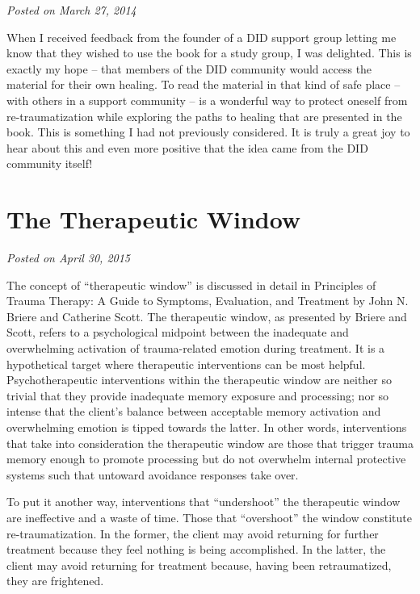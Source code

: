 \documentclass[]{book}
\begin{document}
\emph{Posted on March 27, 2014}

When I received feedback from the founder of a DID support group letting me know that they wished to use the book for a study group, I was delighted. This is exactly my hope -- that members of the DID community would access the material for their own healing. To read the material in that kind of safe place -- with others in a support community -- is a wonderful way to protect oneself from re-traumatization while exploring the paths to healing that are presented in the book. This is something I had not previously considered. It is truly a great joy to hear about this and even more positive that the idea came from the DID community itself!

\hypertarget{the-therapeutic-window}{%
\section{The Therapeutic Window}\label{the-therapeutic-window}}

\emph{Posted on April 30, 2015}

The concept of ``therapeutic window'' is discussed in detail in Principles of Trauma Therapy: A Guide to Symptoms, Evaluation, and Treatment by John N. Briere and Catherine Scott. The therapeutic window, as presented by Briere and Scott, refers to a psychological midpoint between the inadequate and overwhelming activation of trauma-related emotion during treatment. It is a hypothetical target where therapeutic interventions can be most helpful. Psychotherapeutic interventions within the therapeutic window are neither so trivial that they provide inadequate memory exposure and processing; nor so intense that the client's balance between acceptable memory activation and overwhelming emotion is tipped towards the latter. In other words, interventions that take into consideration the therapeutic window are those that trigger trauma memory enough to promote processing but do not overwhelm internal protective systems such that untoward avoidance responses take over.

To put it another way, interventions that ``undershoot'' the therapeutic window are ineffective and a waste of time. Those that ``overshoot'' the window constitute re-traumatization. In the former, the client may avoid returning for further treatment because they feel nothing is being accomplished. In the latter, the client may avoid returning for treatment because, having been retraumatized, they are frightened.
\end{document}
